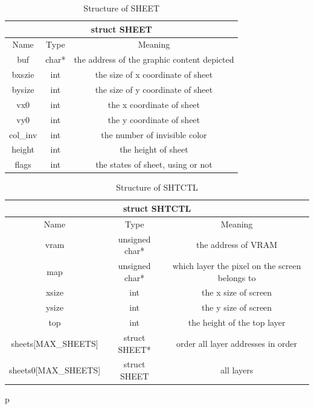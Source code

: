 \documentclass{swfcthesis}
\begin{document}
\begin{table}[!htbp]
  \centering
  \begin{tabular}{|c|c|c|}
    \hline
    \multicolumn{3}{|c|}{struct SHEET} \\
    \hline
    Name & Type & Meaning \\
    \hline
    buf & char* & the address of the graphic content depicted \\
    \hline
    bxszie & int & the size of x coordinate of sheet \\
    \hline
    bysize & int & the size of y coordinate of sheet \\
    \hline
    vx0 & int & the x coordinate of sheet \\
    \hline
    vy0 & int & the y coordinate of sheet \\
    \hline
    col\_inv & int & the number of invisible color \\
    \hline
    height & int & the height of sheet \\
    \hline
    flags & int & the states of sheet, using or not \\
    \hline
  \end{tabular}
  \caption{Structure of SHEET}
  \label{tab:SHEET}
\end{table}

\begin{table}[!htbp]
  \centering
  \begin{tabular}{|c|c|c|}
    \hline
    \multicolumn{3}{|c|}{struct SHTCTL} \\
    \hline
    Name & Type & Meaning \\
    \hline
    vram & unsigned char* & the address of VRAM \\
    \hline
    map & unsigned char* & which layer the pixel on the screen belongs to \\
    \hline
    xsize & int & the x size of screen \\
    \hline
    ysize & int & the y size of screen \\
    \hline
    top & int & the height of the top layer \\
    \hline
    sheets[MAX\_SHEETS] & struct SHEET* & order all layer addresses in order \\
    \hline
    sheets0[MAX\_SHEETS] & struct SHEET & all layers \\
    \hline
  \end{tabular}
  \caption{Structure of SHTCTL}
  \label{tab:SHTCTL}p
\end{table}
\end{document}
